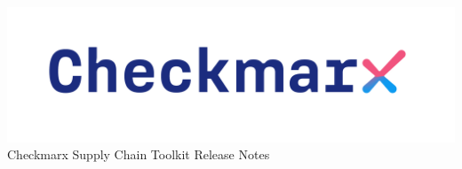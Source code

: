 \documentclass[a4paper, 11pt, oneside]{book}
\begin{document}
\begin{center}
    \includegraphics[scale=.5]{../docs/graphics/cx_logo-dark.png}
    \Huge{Checkmarx Supply Chain Toolkit Release Notes}
\end{center}


\end{document}
